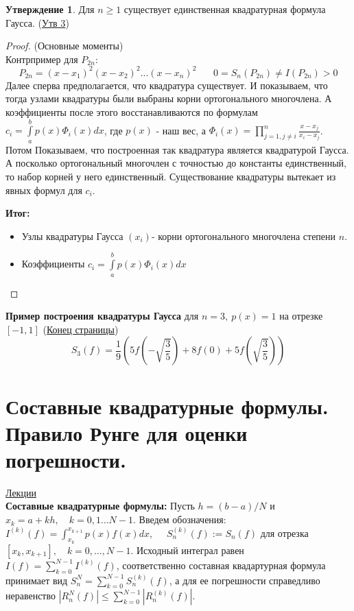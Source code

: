 \documentclass[specialist, subf, href, colorlinks=true, 12pt, times, mtpro, final]{disser}
\theoremstyle{definition}
\newtheorem{state}{Утверждение}[section]
\begin{document}
    \begin{state}
        Для $n \ge 1$ существует единственная квадратурная формула Гаусса. (\hyperlink {lects.42}{Утв 3})
    \end{state}
    \begin{proof} (Основные моменты) \\
        Контрпример для $P_{2n}$:
        $$
            P_{2n} = (x-x_1)^2 (x-x_2)^2 ... (x-x_n)^2 \ \ \ \ \ \ \ \ 0=S_n(P_{2n}) \ne I(P_{2n}) > 0
        $$
        Далее сперва предполагается, что квадратура существует. И показываем, что тогда узлами квадратуры были выбраны корни ортогонального многочлена.
        А коэффициенты после этого восстанавливаются по формулам $c_i = \int\limits_a^b p(x)\Phi_i(x)dx$, где $p(x)$ - наш вес, а $\Phi_i(x) = \prod\limits_{j = 1, j\ne i}^n \frac{x-x_j}{x_i-x_j}$. \\
        Потом Показываем, что построенная так квадратура является квадратурой Гаусса.\\
        А посколько ортогональный многочлен с точностью до константы единственный, то набор корней у него единственный. Существование квадратуры вытекает из явных формул для $c_i$.
        
        \textbf{Итог:}
        \begin{itemize}
            \item Узлы квадратуры Гаусса $(x_i)$- корни ортогонального многочлена степени $n$.
            \item Коэффициенты  $c_i = \int\limits_a^b p(x)\Phi_i(x)dx$
        \end{itemize}
        
    \end{proof}
    \textbf{Пример построения квадратуры Гаусса} для $n=3, \ p(x) = 1$ на отрезке $[-1,1]$ (\hyperlink {lects.42}{Конец страницы}) 
    $$
        S_3(f) = \frac{1}{9} \left( 5f\left( -\sqrt{\frac{3}{5}} \right) + 8f(0) + 5f\left( \sqrt{\frac{3}{5}} \right) \right)
    $$

\section {Составные квадратурные формулы. Правило Рунге для оценки погрешности.}
    \hyperlink {lects.44}{Лекции}\\
    \textbf{Составные квадратурные формулы:}
    Пусть $h = (b-a)/N$ и $x_k = a + kh, \quad k = 0, 1 \ldots N-1$. Введем обозначения: $I^{(k)}(f) = \int_{x_k}^{x_{k+1}} p(x)f(x)dx,$ $\quad S^{(k)}_n(f) := S_n(f)$ для отрезка $[x_k, x_{k+1}], \quad k = 0, \ldots, N-1$. Исходный интеграл равен $I(f) = \sum_{k=0}^{N-1}I^{(k)}(f)$, соответственно составная квадартурная формула принимает вид $S^N_n = \sum_{k=0}^{N-1} S_n^{(k)}(f)$, а для ее погрешности справедливо неравенство $|R_n^N(f)| \leq \sum_{k=0}^{N-1}|R_n^{(k)}(f)|$.
    
\end{document}
